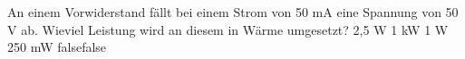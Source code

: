     {An einem Vorwiderstand fällt bei einem Strom von 50 mA eine Spannung von 50 V ab. Wieviel Leistung wird an diesem in Wärme umgesetzt?}
    {2,5 W}
    {1 kW}
    {1 W}
    {250 mW}
    {false}{false}